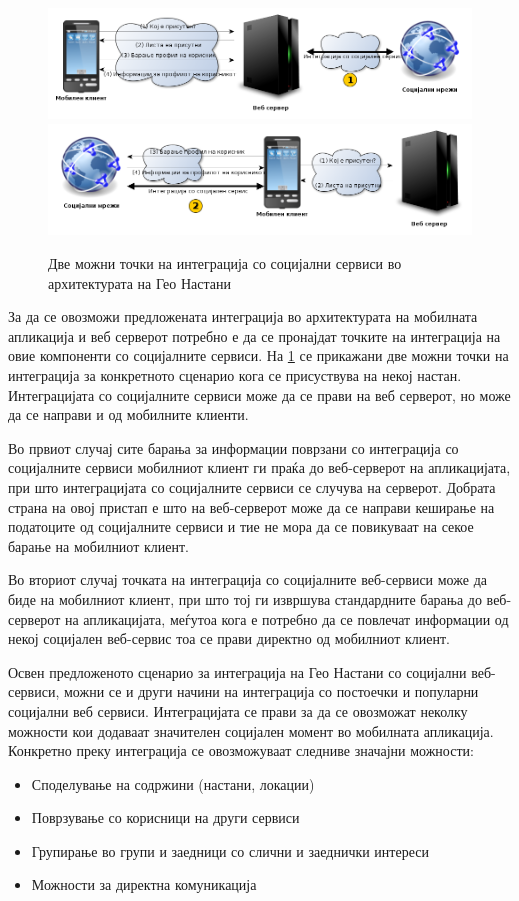\begin{figure}[htb]
\centering
\includegraphics[scale=0.4]{images/social_context_1}
\includegraphics[scale=0.4]{images/social_context_2}
\caption{Две можни точки на интеграција со социјални сервиси во архитектурата
на Гео Настани}
\label{fig:social}
\end{figure}
 

За да се овозможи предложената интеграција во архитектурата на
мобилната апликација и веб серверот потребно е да се пронајдат точките на
интеграција на овие компоненти со социјалните сервиси. На \ref{fig:social} се
прикажани две можни точки на интеграција за конкретното сценарио кога се присуствува на
некој настан. Интеграцијата со социјалните сервиси може да се прави на веб
серверот, но може да се направи и од мобилните клиенти. 

Во првиот случај сите барања за информации поврзани со интеграција со
социјалните сервиси мобилниот клиент ги праќа до веб-серверот на апликацијата,
при што интеграцијата со социјалните сервиси се случува на серверот. Добрата
страна на овој пристап е што на веб-серверот може да се направи кеширање на
податоците од социјалните сервиси и тие не мора да се повикуваат на секое барање
на мобилниот клиент.

Во вториот случај точката на интеграција со социјалните веб-сервиси може да биде
на мобилниот клиент, при што тој ги извршува стандардните барања до веб-серверот
на апликацијата, меѓутоа кога е потребно да се повлечат информации од некој
социјален веб-сервис тоа се прави директно од мобилниот клиент.

Освен предложеното сценарио за интеграција на Гео Настани со социјални
веб-сервиси, можни се и други начини на интеграција со постоечки и популарни
социјални веб сервиси. Интеграцијата се прави за да се овозможат неколку
можности кои додаваат значителен социјален момент во мобилната апликација.
Конкретно преку интеграција се овозможуваат следниве значајни можности:
\begin{itemize}
  \item Споделување на содржини (настани, локации)
  \item Поврзување со корисници на други сервиси
  \item Групирање во групи и заедници со слични и заеднички интереси
  \item Можности за директна комуникација
\end{itemize}
    
  
